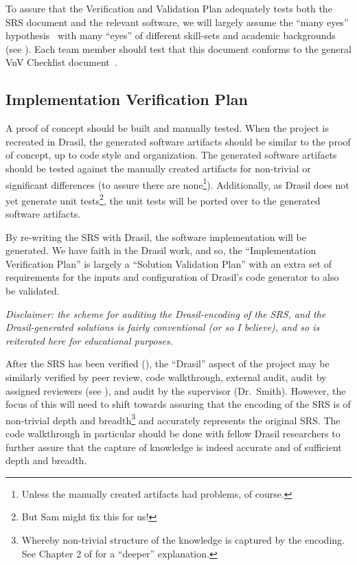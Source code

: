 \documentclass[12pt, titlepage]{article}
\begin{document}
To assure that the Verification and Validation Plan adequately tests both the
SRS document and the relevant software, we will largely assume the ``many eyes''
hypothesis~\cite{Caraco1980avian} with many ``eyes'' of different skill-sets and
academic backgrounds (see ). Each team member should
test that this document conforms to the general VnV Checklist
document~\cite{SmithCapTemplate}.

\subsection{Implementation Verification Plan}

A proof of concept should be built and manually tested. When the project is
recreated in Drasil, the generated software artifacts should be similar to the
proof of concept, up to code style and organization. The generated software
artifacts should be tested against the manually created artifacts for
non-trivial or significant differences (to assure there are none\footnote{Unless
the manually created artifacts had problems, of course.}). Additionally, as
Drasil does not yet generate unit tests\footnote{But Sam might fix this for
us!}, the unit tests will be ported over to the generated software artifacts.

By re-writing the SRS with Drasil, the software implementation will be
generated. We have faith in the Drasil work, and so, the ``Implementation
Verification Plan'' is largely a ``Solution Validation Plan'' with an extra set
of requirements for the inputs and configuration of Drasil's code generator to
also be validated. 

\textit{Disclaimer: the scheme for auditing the Drasil-encoding of the SRS, and
the Drasil-generated solutions is fairly conventional (or so I believe), and so
is reiterated here for educational purposes.}

After the SRS has been verified (), the ``Drasil''
aspect of the project may be similarly verified by peer review, code
walkthrough, external audit, audit by assigned reviewers (see
), and audit by the supervisor (Dr.~Smith). However, the
focus of this will need to shift towards assuring that the encoding of the SRS
is of non-trivial depth and breadth\footnote{Whereby non-trivial structure of
the knowledge is captured by the encoding. See Chapter 2 of \cite{Balaci2022MSc}
for a ``deeper'' explanation.} and accurately represents the original SRS. The
code walkthrough in particular should be done with fellow Drasil researchers to
further assure that the capture of knowledge is indeed accurate and of
sufficient depth and breadth. 
\end{document}
